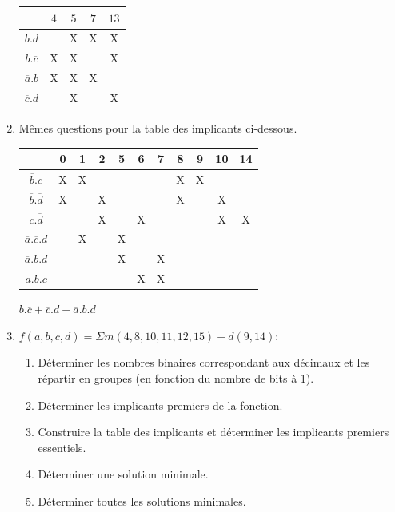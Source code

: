 \documentclass[a4paper,10pt]{exam}
\begin{document}
\begin{enumerate}
      \begin{center}
      \begin{tabular}{c|c|c|c|c|}
        & $4$& $5$ & $7$ & $13$\\
                       \hline
        $b.d$           &   & X & X & X \\
        $b.\overline{c}$& X & X &   & X \\
        $\overline{a}.b$& X & X & X &   \\
        $\overline{c}.d$&   & X &   & X
      \end{tabular}
      \end{center}
    \item Mêmes questions pour la table des implicants ci-dessous.
      \begin{center}
      \begin{tabular}{c|c|c|c|c|c|c|c|c|c|c|}
                                   &0&1&2&5&6&7&8&9&10&14\\
                                   \hline
        $\overline{b}.\overline{c}$ &X&X& & & & &X&X&  &  \\
        $\overline{b}.\overline{d}$ &X& &X& & & &X& &X &  \\
        $c.\overline{d}$            & & &X& &X& & & &X &X \\
        $\overline{a}.\overline{c}.d$& &X& &X& & & & &  &  \\
        $\overline{a}.b.d$           & & & &X& &X& & &  &  \\
        $\overline{a}.b.c$           & & & & &X&X& & &  &
      \end{tabular}
      \end{center}

      \begin{solution}
        $\overline{b}.\overline{c} + \overline{c}.d + \overline{a}.b.d$
      \end{solution}

    \item $f(a,b,c,d)=\Sigma m(4,8,10,11,12,15) + d(9,14)$:
      \begin{enumerate}
        \item Déterminer les nombres binaires correspondant aux décimaux et les
          répartir en groupes (en fonction du nombre de bits à 1).
        \item Déterminer les implicants premiers de la fonction.
        \item Construire la table des implicants et déterminer les implicants
          premiers essentiels.
        \item Déterminer une solution minimale.
        \item Déterminer toutes les solutions minimales.
      \end{enumerate}


\end{enumerate}
\end{document}
